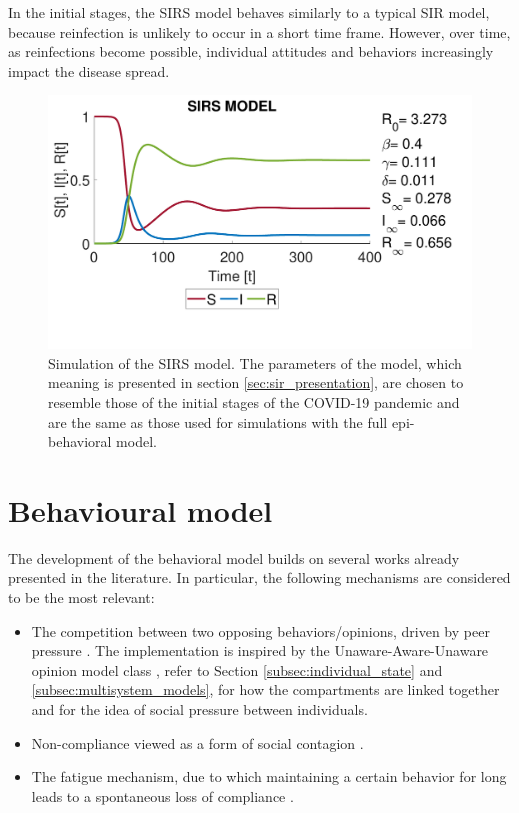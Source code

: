 In the initial stages, the SIRS model behaves similarly to a typical SIR model, because reinfection is unlikely to occur in a short time frame. However, over time, as reinfections become possible, individual attitudes and behaviors increasingly impact the disease spread.

\begin{figure}[ht]
	\centering
	\includegraphics[width=0.6\linewidth]{1_corpo/figure/r0/sirs_figure}
	\caption[SIRS simulation]{Simulation of the SIRS model. The parameters of the model, which meaning is presented in section \ref{sec:sir_presentation}, are chosen to resemble those of the initial stages of the COVID-19 pandemic \cite{data_R0_covid} and are the same as those used for simulations with the full epi-behavioral model.}
	\label{fig:sirsfigure}
\end{figure}

\section{Behavioural model}
\label{sec:behavioral_model}

The development of the behavioral model builds on several works already presented in the literature. In particular, the following mechanisms are considered to be the most relevant:
\begin{itemize}
	\item The competition between two opposing behaviors/opinions, driven by peer pressure \cite{Epstein_2021}. The implementation is inspired by the Unaware-Aware-Unaware opinion model class \cite{Zuo2022, Peng2021}, refer to Section \ref{subsec:individual_state} and \ref{subsec:multisystem_models}, for how the compartments are linked together and for the idea of social pressure between individuals.
	
	\item Non-compliance viewed as a form of social contagion \cite{Bongarti2023}.
	 
	\item The fatigue mechanism, due to which maintaining a certain behavior for long leads to a spontaneous loss of compliance \cite{Epstein_2021}.
\end{itemize}

